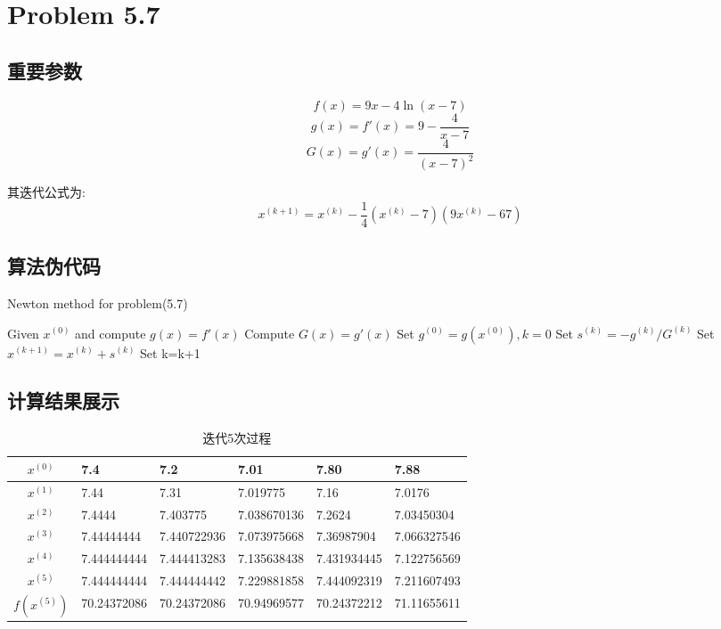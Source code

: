 \newpage
\section{Problem 5.7}
\subsection{重要参数}
\[f(x)=9x-4\ln(x-7)\]
\[g(x)=f'(x)=9-\dfrac{4}{x-7}\]
\[G(x)=g'(x)=\dfrac{4}{(x-7)^2}\]

其迭代公式为:
\begin{equation}
x^{(k+1)}=x^{(k)}-\dfrac{1}{4}(x^{(k)}-7)(9x^{(k)}-67)
\label{eq1}
\end{equation}


\subsection{算法伪代码}
\begin{algorithm}[h]  
\caption{Newton method for problem(5.7)}  
\begin{algorithmic}[1]  
\STATE Given $x^{(0)}$ and compute $g(x)=f'(x)$
\STATE Compute $G(x)=g'(x)$
\STATE Set $g^{(0)}=g(x^{(0)}),k=0$
\STATE Set $s^{(k)}=-g^{(k)}/G^{(k)}$
\STATE Set $x^{(k+1)}=x^{(k)}+s^{(k)}$
\STATE Set k=k+1
\ENDWHILE
\end{algorithmic}  
\end{algorithm}  



\subsection{计算结果展示}
\begin{table}[htbp]
  \centering
  \caption{迭代5次过程}
    \begin{tabular}{clllll}
\toprule
  $x^{(0)}$&7.4  & 7.2  & 7.01 &7.80  & 7.88 \\
	\midrule
   $x^{(1)}$& 7.44  & 7.31  & 7.019775 & 7.16  & 7.0176 \\
    $x^{(2)}$&7.4444 & 7.403775 & 7.038670136 & 7.2624 & 7.03450304 \\
    $x^{(3)}$&7.44444444 & 7.440722936 & 7.073975668 & 7.36987904 & 7.066327546 \\
   $ x^{(4)}$&7.444444444 & 7.444413283 & 7.135638438 & 7.431934445 & 7.122756569 \\
    $x^{(5)}$&7.444444444 & 7.444444442 & 7.229881858 & 7.444092319 & 7.211607493 \\
	\midrule
    $f(x^{(5)})$&70.24372086 & 70.24372086 & 70.94969577 & 70.24372212 & 71.11655611 \\
	\bottomrule
    \end{tabular}%
  \label{tab:addlabel}%
\end{table}%

